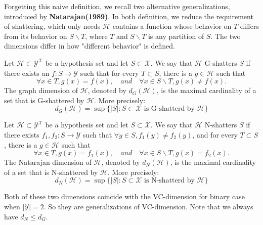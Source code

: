 Forgetting this naive definition, we recall two alternative generalizations, introduced by \textbf{Natarajan(1989)}. In both definition, we reduce the requirement of shattering, which only needs $\mathcal{H}$ contains a function whose behavior on $T$ differs from its behavior on $S\backslash T$, where $T$ and $S\backslash T$ is any partition of $S$. The two dimensions differ in how "different behavior" is defined.
\begin{definition}
	Let $\mathcal{H} \subset \mathcal{Y}^{\mathcal{X}}$ be a hypothesis set and let $S \subset \mathcal{X}$. We say that $\mathcal{H}$ G-shatters $S$ if there exists an $f: S\to \mathcal{Y}$ such that for every $T\subset S$, there is a $g \in \mathcal{H}$ such that
	\begin{equation}
	\forall x \in T, g(x)=f(x), \quad and \quad \forall x \in S\backslash T, g(x)\ne f(x).
	\end{equation}
	The graph dimension of $\mathcal{H}$, denoted by $d_G(\mathcal{H})$, is the maximal cardinality of a set that is G-shattered by $\mathcal{H}$. More precisely:
	\begin{equation}
	d_G(\mathcal{H}) = \sup \{|S| : S \subset \mathcal{X} \text{ is G-shatterd by } \mathcal{H}\}
	\end{equation} 
\end{definition}

\begin{definition}
	Let $\mathcal{H} \subset \mathcal{Y}^{\mathcal{X}}$ be a hypothesis set and let $S \subset \mathcal{X}$. We say that $\mathcal{H}$ N-shatters $S$ if there exists $f_1, f_2 : S\to \mathcal{Y}$ such that $\forall y \in S, f_1(y)\ne f_2(y)$, and for every $T\subset S$, there is a $g \in \mathcal{H}$ such that
	\begin{equation}
	\forall x \in T, g(x)=f_1(x), \quad and \quad \forall x \in S\backslash T, g(x)=f_2(x).
	\end{equation}
	The Natarajan dimension of $\mathcal{H}$, denoted by $d_N(\mathcal{H})$, is the maximal cardinality of a set that is N-shattered by $\mathcal{H}$. More precisely:
	\begin{equation}
	d_N(\mathcal{H}) = \sup \{|S| : S \subset \mathcal{X} \text{ is N-shatterd by } \mathcal{H}\}
	\end{equation} 
\end{definition}
Both of these two dimensions coincide with the VC-dimension for binary case when $|\mathcal{Y}|=2$. So they are generalizations of VC-dimension. Note that we always have $d_N  \leq d_G$.

